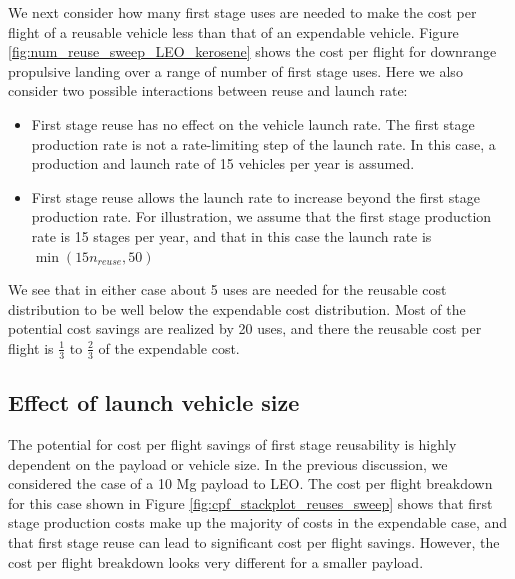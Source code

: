 \documentclass{iaf-iac}
\begin{document}
\begin{multicols}{2}
We next consider how many first stage uses are needed to make the cost per flight of a reusable vehicle less than that of an expendable vehicle. Figure \ref{fig:num_reuse_sweep_LEO_kerosene} shows the cost per flight for downrange propulsive landing over a range of number of first stage uses. Here we also consider two possible interactions between reuse and launch rate:

\begin{itemize}
  \item First stage reuse has no effect on the vehicle launch rate. The first stage production rate is not a rate-limiting step of the launch rate. In this case, a production and launch rate of 15 vehicles per year is assumed. 
  \item First stage reuse allows the launch rate to increase beyond the first stage production rate. For illustration, we assume that the first stage production rate is 15 stages per year, and that in this case the launch rate is $\min(15 n_{reuse}, 50)$
\end{itemize}

We see that in either case about 5 uses are needed for the reusable cost distribution to be well below the expendable cost distribution. Most of the potential cost savings are realized by 20 uses, and there the  reusable cost per flight is $\frac{1}{3}$ to $\frac{2}{3}$ of the expendable cost.


\subsection{Effect of launch vehicle size}



The potential for cost per flight savings of first stage reusability is highly dependent on the payload or vehicle size. In the previous discussion, we considered the case of a 10 Mg payload to LEO. The cost per flight breakdown for this case shown in Figure \ref{fig:cpf_stackplot_reuses_sweep} shows that first stage production costs make up the majority of costs in the expendable case, and that first stage reuse can lead to significant cost per flight savings. However, the cost per flight breakdown looks very different for a smaller payload. 




\end{multicols}
\end{document}
